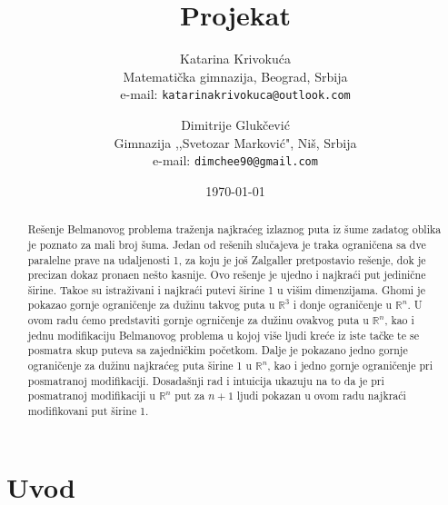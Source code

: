 \documentclass[11pt,letter]{article}
\begin{document}
\title{\bf{Projekat}}

\author{
Katarina Krivoku\'ca \\
Matemati\v cka gimnazija, Beograd, Srbija\\
e-mail: \tt{katarinakrivokuca@outlook.com} \\
\and
Dimitrije Gluk\v cevi\' c \\
Gimnazija ,,Svetozar Markovi\' c", Ni\v s, Srbija \\
e-mail: \tt{dimchee90@gmail.com} \\
}

\date{\today}
\maketitle %

\begin{abstract}
Re\v senje Belmanovog problema tra\v zenja najkra\' ceg izlaznog puta iz \v sume zadatog oblika je poznato za mali broj \v suma. Jedan od re\v senih slu\v cajeva je traka ograni\v cena sa dve paralelne prave na udaljenosti 1, za koju je jo\v s  Zalgaller pretpostavio re\v senje, dok je precizan dokaz prona\dj en ne\v sto kasnije. Ovo re\v senje je ujedno i najkra\' ci put jedini\v cne \v sirine. Tako\dj e su istra\v zivani i najkra\' ci putevi \v sirine 1 u vi\v sim dimenzijama. Ghomi je pokazao gornje ograni\v cenje za du\v zinu takvog puta u $\mathbb{R}^3$ i donje ograni\v cenje u $\mathbb{R}^n$. U ovom radu \' cemo predstaviti gornje ogrni\v cenje za du\v zinu ovakvog puta u $\mathbb{R}^n$, kao i jednu modifikaciju Belmanovog problema u kojoj vi\v se ljudi kre\' ce iz iste ta\v cke te se posmatra skup puteva sa zajedni\v ckim po\v cetkom. Dalje je pokazano jedno gornje ograni\v cenje za du\v zinu najkra\' ceg puta \v sirine 1 u $\mathbb{R}^n$, kao i jedno gornje ograni\v cenje pri posmatranoj modifikaciji. Dosada\v snji rad i intuicija ukazuju na to da je pri posmatranoj modifikaciji u $\mathbb{R}^n$ put za $n+1$ ljudi pokazan u ovom radu najkra\' ci modifikovani put \v sirine 1.


\end{abstract}

\section[Uvod]{Uvod}
\bigskip
\end{document}
